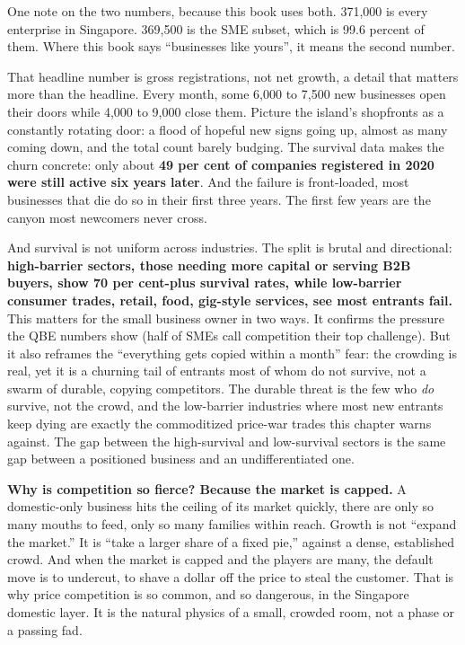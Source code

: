 \documentclass[10pt,twoside,openany]{memoir}
\begin{document}
{{{{{{{{One note on the two numbers, because this book uses both. 371,000 is
every enterprise in Singapore. 369,500 is the SME subset, which is 99.6
percent of them. Where this book says ``businesses like yours'', it
means the second number.

That headline number is gross registrations, not net growth, a detail
that matters more than the headline. Every month, some 6,000 to 7,500
new businesses open their doors while 4,000 to 9,000 close
them.\cite{acra-registry} Picture the island's shopfronts as a
constantly rotating door: a flood of hopeful new signs going up, almost
as many coming down, and the total count barely budging. The survival
data makes the churn concrete: only about \textbf{49 per cent of
companies registered in 2020 were still active six years later}. And the
failure is front-loaded, most businesses that die do so in their first
three years. The first few years are the canyon most newcomers never
cross.

And survival is not uniform across industries. The split is brutal and
directional: \textbf{high-barrier sectors, those needing more capital or
serving B2B buyers, show 70 per cent-plus survival rates, while
low-barrier consumer trades, retail, food, gig-style services, see most
entrants fail.} This matters for the small business owner in two ways.
It confirms the pressure the QBE numbers show (half of SMEs call
competition their top challenge). But it also reframes the ``everything
gets copied within a month'' fear: the crowding is real, yet it is a
churning tail of entrants most of whom do not survive, not a swarm of
durable, copying competitors. The durable threat is the few who
\emph{do} survive, not the crowd, and the low-barrier industries where
most new entrants keep dying are exactly the commoditized price-war
trades this chapter warns against. The gap between the high-survival and
low-survival sectors is the same gap between a positioned business and
an undifferentiated one.

\textbf{Why is competition so fierce? Because the market is capped.} A
domestic-only business hits the ceiling of its market quickly, there are
only so many mouths to feed, only so many families within reach. Growth
is not ``expand the market.'' It is ``take a larger share of a fixed
pie,'' against a dense, established crowd. And when the market is capped
and the players are many, the default move is to undercut, to shave a
dollar off the price to steal the customer. That is why price
competition is so common, and so dangerous, in the Singapore domestic
layer. It is the natural physics of a small, crowded room, not a phase
or a passing fad.

}}}}}}}}
\end{document}

